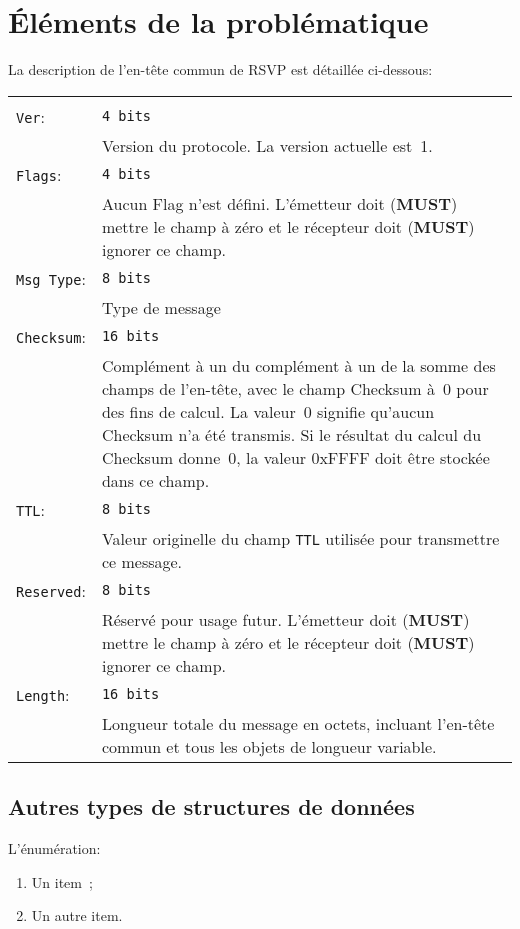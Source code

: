 \section{Éléments de la problématique}  %
La description de \mbox{l'en-tête} commun de RSVP est détaillée ci-dessous:\\
\begin{tabular}{p{1in}p{4.5in}}
&\\ %
\texttt{Ver}: & \texttt{4 bits}\\
          & Version du protocole. La version actuelle est~1.\\[5pt]
\texttt{Flags}: & \texttt{4 bits}\\
          & Aucun Flag n'est défini. L'émetteur doit (\textbf{MUST})
          mettre le champ à zéro et le récepteur doit (\textbf{MUST})
          ignorer ce champ.\\[5pt]
\texttt{Msg Type}: & \texttt{8 bits}\\
          & Type de message\\[5pt]
\texttt{Checksum}: & \texttt{16 bits}\\
          & Complément à un du complément à un de la somme des champs
          de \mbox{l'en-tête}, avec le champ Checksum à~0 pour des
          fins de calcul. La valeur~0 signifie qu'aucun Checksum n'a
          été transmis. Si le résultat du calcul du Checksum donne~0,
          la valeur 0xFFFF doit être stockée dans ce champ.\\[5pt]
\texttt{TTL}: & \texttt{8 bits}\\
          & Valeur originelle du champ \texttt{TTL} utilisée pour
          transmettre ce message.\\[5pt]
\texttt{Reserved}: & \texttt{8 bits}\\
          & Réservé pour usage futur. L'émetteur doit (\textbf{MUST})
          mettre le champ à zéro et le récepteur doit (\textbf{MUST})
          ignorer ce champ.\\[5pt]
\texttt{Length}: & \texttt{16 bits}\\
          & Longueur totale du message en octets, incluant
          \mbox{l'en-tête} commun et tous les objets de longueur
          variable.
\end{tabular}

\subsection{Autres types de structures de données}
L'énumération:
\begin{enumerate}
\item Un item~;
\item Un autre item.
\end{enumerate}


